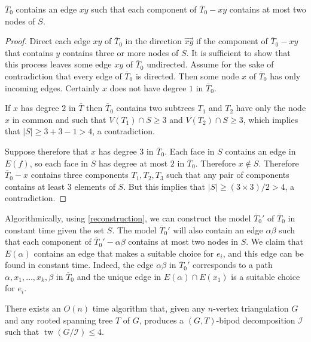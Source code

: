 \documentclass{patmorin}
\DeclareMathOperator{\tw}{tw}
\begin{document}
\begin{clm}\label{director}
  $\overline{T}_0$ contains an edge $xy$ such that each component of $\overline{T}_0-xy$ contains at most two nodes of $S$.
\end{clm}

\begin{proof}
  Direct each edge $xy$ of $\overline{T}_0$ in the direction $\overrightarrow{xy}$ if the component of $\overline{T}_0-xy$ that contains $y$ contains three or more nodes of $S$.  It is sufficient to show that this process leaves some edge $xy$ of $\overline{T}_0$ undirected.  Assume for the sake of contradiction that every edge of $\overline{T}_0$ is directed.  Then some node $x$ of $\overline{T}_0$ has only incoming edges. Certainly $x$ does not have degree $1$ in $\overline{T}_0$.

  If $x$ has degree $2$ in $\overline{T}$ then $\overline{T}_0$ contains two subtrees $T_1$ and $T_2$ have only the node $x$ in common and such that $V(T_1)\cap S\ge 3$ and $V(T_2)\cap S\ge 3$, which implies that $|S|\ge 3+3-1 > 4$, a contradiction.

  Suppose therefore that $x$ has degree $3$ in $\overline{T}_0$.  Each face in $S$ contains an edge in $E(f)$, so each face in $S$ has degree at most $2$ in $\overline{T}_0$.  Therefore $x\not\in S$.  Therefore $\overline{T}_0-x$ contains three components $T_1, T_2, T_3$ such that any pair of components contains at least $3$ elements of $S$.  But this implies that $|S|\ge (3\times 3)/2>4$, a contradiction.
\end{proof}



Algorithmically, using \cref{reconstruction}, we can construct the model $\overline{T}_0'$ of $\overline{T}_0$ in constant time given the set $S$.  The model $\overline{T}_0'$ will also contain an edge $\alpha\beta$ such that each component of $\overline{T}_0'-\alpha\beta$ contains at most two nodes in $S$. We claim that $E(\alpha)$  contains an edge that makes a suitable choice for $e_i$, and this edge can be found in constant time.  Indeed, the edge $\alpha\beta$ in  $\overline{T}_0'$ corresponds to a path $\alpha,x_1,\ldots,x_k,\beta$ in $\overline{T}_0$ and the unique edge in $E(\alpha)\cap E(x_1)$ is a suitable choice for $e_i$.

\begin{thm}\label{bipod_decomposition_algorithm}
  There exists an $O(n)$ time algorithm that, given any $n$-vertex triangulation $G$ and any rooted spanning tree $T$ of $G$, produces a $(G,T)$-bipod decomposition $\mathcal{I}$ such that $\tw(G/\mathcal{I})\le 4$.
\end{thm}
\end{document}
